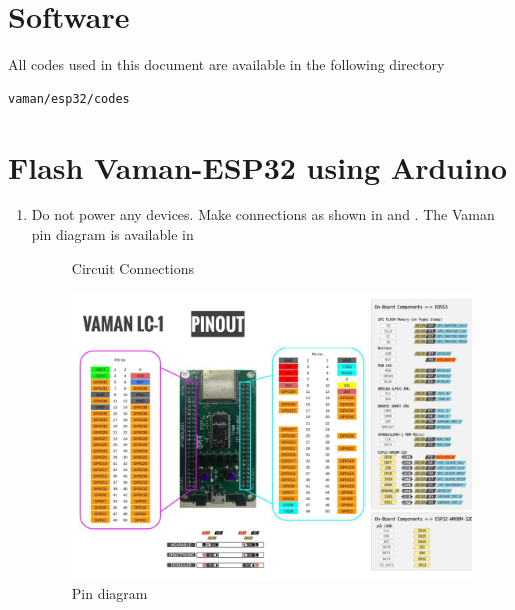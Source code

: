\documentclass[12pt]{article}
\begin{document}
\fi

\section{Software}
%
All codes used in this document are available in the following directory 
\begin{lstlisting}
vaman/esp32/codes
\end{lstlisting}
\section{Flash Vaman-ESP32 using Arduino}

\renewcommand{\theequation}{\theenumi}
\renewcommand{\thefigure}{\theenumi}
\begin{enumerate}[label=\thesection.\arabic*.,ref=\thesection.\theenumi]
\item Do not power any devices.  Make connections as shown in  and 
. 
		The Vaman pin diagram is available in 
\begin{figure}
\centering

\caption{Circuit Connections}
\label{fig:vaman/uart/1}
\end{figure}
\begin{figure}[!ht]
\centering
\includegraphics[width = \textwidth]{vaman/fpga/setup/figs/pin_sheet.png}
\caption{Pin diagram}
\label{fig:vaman/fpga/setup/pin_sheet}

\end{figure}
\end{enumerate}
\end{document}
